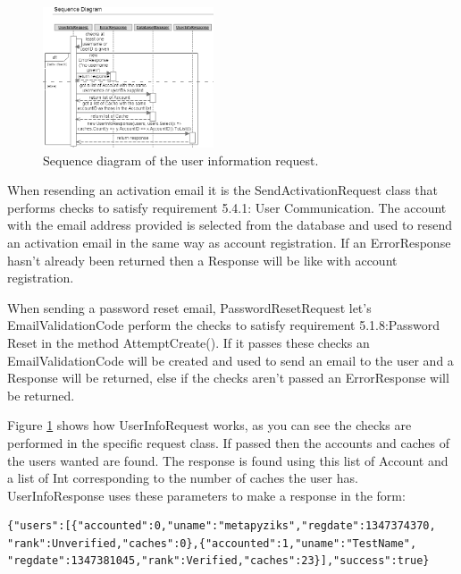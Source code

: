 \begin{figure}
    \includegraphics[width=0.45\textwidth]{images/sequence/userinfo}
    \caption{Sequence diagram of the user information request.}
    \label{fig:userInfo}
\end{figure}

When resending an activation email it is the SendActivationRequest class that performs checks to satisfy requirement 5.4.1: User Communication. The account with the email address provided is selected from the database and used to resend an activation email in the same way as account registration. If an ErrorResponse hasn't already been returned then a Response will be like with account registration.

When sending a password reset email, PasswordResetRequest let's EmailValidationCode perform the checks to satisfy requirement 5.1.8:Password Reset in the method AttemptCreate(). If it passes these checks an EmailValidationCode will be created and used to send an email to the user and a Response will be returned, else if the checks aren't passed an ErrorResponse will be returned.

Figure \ref{fig:userInfo} shows how UserInfoRequest works, as you can see the checks are performed in the specific request class. If passed then the accounts and caches of the users wanted are found. The response is found using this list of Account and a list of Int corresponding to the number of caches the user has. UserInfoResponse uses these parameters to make a response in the form:

\begin{verbatim}
{"users":[{"accounted":0,"uname":"metapyziks","regdate":1347374370,
"rank":Unverified,"caches":0},{"accounted":1,"uname":"TestName",
"regdate":1347381045,"rank":Verified,"caches":23}],"success":true}
\end{verbatim}

